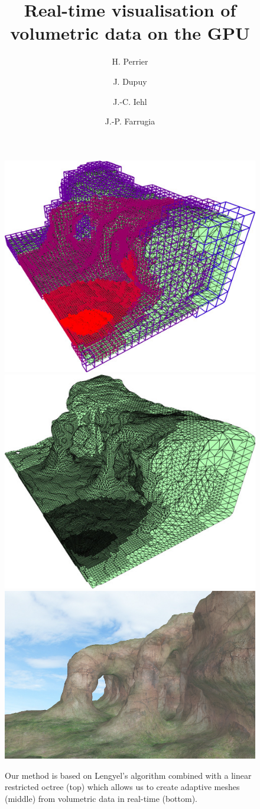 \documentclass[twocolumn]{cgi2015_latex/svjour3}          %
\begin{document}
\title{Real-time visualisation of volumetric data on the GPU}
\subtitle{}
\author{H. Perrier \and J. Dupuy \and J.-C. Iehl \and J.-P. Farrugia}
\date{ }%

\maketitle

\begin{figure}
\centering
\includegraphics[width=0.7\linewidth]{octree}
\includegraphics[width=0.7\linewidth]{mesh_muti_res}
\includegraphics[width=0.7\linewidth]{terrain_potential}
\caption{Our method is based on Lengyel's algorithm \cite{lengyel2010voxel} combined with a linear restricted octree (top) which allows us to create adaptive meshes (middle) from volumetric data in real-time (bottom).}
\end{figure}
\end{document}
